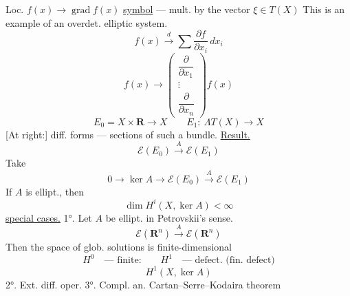 Loc. $f(x)\longrightarrow\operatorname{grad}f(x)$
\underline{symbol} --- mult. by the vector $\xi\in T(X)$
This is an example of an overdet. elliptic system.
\begin{equation*}
f(x)\overset d{\longrightarrow}\sum\frac{\partial f}{\partial x_i}\,dx_i
\end{equation*}
\begin{equation*}
f(x)\longrightarrow
\begin{pmatrix}\dfrac\partial{\partial x_1}\\\vdots\\\dfrac\partial{\partial x_n}\end{pmatrix}f(x)
\end{equation*}
\begin{equation*}
E_0=X\times\mathbf R\longrightarrow X\qquad
E_1:\ \Lambda T(X)\longrightarrow X
\end{equation*}
[At right:] diff. forms --- sections of such a bundle.
\underline{Result.}
\begin{equation*}
\mathcal E(E_0)\overset A{\longrightarrow}\mathcal E(E_1)
\end{equation*}
Take
\begin{equation*}
0\longrightarrow\ker A\longrightarrow\mathcal E(E_0)
\overset A{\longrightarrow}\mathcal E(E_1)
\end{equation*}
If $A$ is ellipt., then
\begin{equation*}
\dim H^i(X,\ker A)<\infty
\end{equation*}
\underline{special cases.}
1°. Let $A$ be ellipt. in Petrovskii's sense.
\begin{equation*}
\mathcal E(\mathbf R^n)\overset A{\longrightarrow}\mathcal E(\mathbf R^n)
\end{equation*}
Then the space of glob. solutions is finite-dimensional
\begin{equation*}
H^0\quad\text{--- finite:}\qquad H^1\quad\text{--- defect. (fin. defect)}
\end{equation*}
\begin{equation*}
H^1(X,\ker A)
\end{equation*}
2°. Ext. diff. oper.
3°. Compl. an. Cartan--Serre--Kodaira theorem

